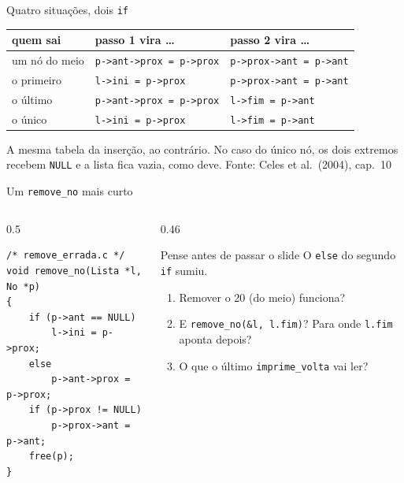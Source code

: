 \documentclass[aspectratio=169]{beamer}
\newcommand{\fonte}[1]{\vfill\hfill{\scriptsize\textcolor{UFSGray}{Fonte: #1}}}
\begin{document}
\begin{frame}{Quatro situações, dois \texttt{if}}
  \begin{center}
  \small
  \begin{tabular}{@{}lll@{}}
    \toprule
    quem sai & passo 1 vira \ldots & passo 2 vira \ldots\\
    \midrule
    um nó do meio   & \texttt{p->ant->prox = p->prox} & \texttt{p->prox->ant = p->ant}\\
    o primeiro      & \texttt{l->ini = p->prox} & \texttt{p->prox->ant = p->ant}\\
    o último        & \texttt{p->ant->prox = p->prox} & \texttt{l->fim = p->ant}\\
    o único         & \texttt{l->ini = p->prox} & \texttt{l->fim = p->ant}\\
    \bottomrule
  \end{tabular}
  \end{center}
  \small A mesma tabela da inserção, ao contrário. No caso do único nó, os
  dois extremos recebem \texttt{NULL} e a lista fica vazia, como deve.
  \fonte{Celes et al.\ (2004), cap.~10~\cite{celes2004introducao}}
\end{frame}

\begin{frame}[fragile]{Um \texttt{remove\_no} mais curto}
  \begin{columns}[c]
    \begin{column}{0.5\textwidth}
\begin{lstlisting}[style=tinyC]
/* remove_errada.c */
void remove_no(Lista *l, No *p)
{
    if (p->ant == NULL)
        l->ini = p->prox;
    else
        p->ant->prox = p->prox;
    if (p->prox != NULL)
        p->prox->ant = p->ant;
    free(p);
}
\end{lstlisting}
    \end{column}
    \begin{column}{0.46\textwidth}
      \begin{block}{Pense antes de passar o slide}
        \small O \texttt{else} do segundo \texttt{if} sumiu.
        \begin{enumerate}
          \item Remover o 20 (do meio) funciona?
          \item E \texttt{remove\_no(\&l, l.fim)}? Para onde
            \texttt{l.fim} aponta depois?
          \item O que o último \texttt{imprime\_volta} vai ler?
        \end{enumerate}
      \end{block}
    \end{column}
  \end{columns}
\end{frame}
\end{document}
